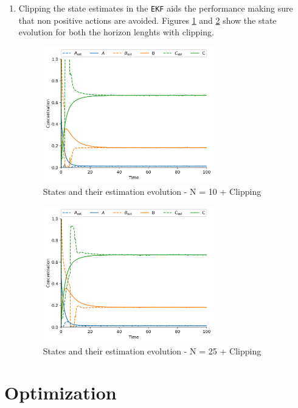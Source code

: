 \documentclass[]{article}
\begin{document}
\begin{enumerate}
	\item Clipping the state estimates in the \texttt{EKF} aids the performance making sure that non positive actions are avoided. 
	Figures \ref{fig:assignment52_1} and \ref{fig:assignment52_2} show the state evolution for both the horizon lenghts with clipping.
	\begin{figure}[H]
		\centering
		\includegraphics[width=0.7\textwidth]{images/Assignment5_N=10_True.png}
		\caption{States and their estimation evolution - N = 10 + Clipping}
		\label{fig:assignment52_1}
	\end{figure}
	\begin{figure}[H]
		\centering
		\includegraphics[width=0.7\textwidth]{images/Assignment5_N=25_True.png}
		\caption{States and their estimation evolution - N = 25 + Clipping}
		\label{fig:assignment52_2}
	\end{figure}
\end{enumerate}




\newpage 
\section{Optimization}
\end{document}
